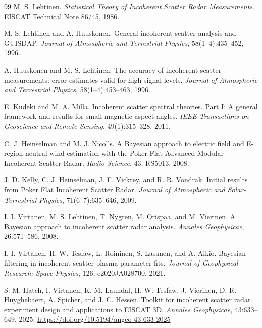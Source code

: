 \documentclass[11pt]{article}
\begin{document}
\begin{thebibliography}{99}
M. S. Lehtinen.
\newblock \emph{Statistical Theory of Incoherent Scatter Radar Measurements}.
\newblock EISCAT Technical Note 86/45, 1986.

M. S. Lehtinen and A. Huuskonen.
\newblock General incoherent scatter analysis and GUISDAP.
\newblock \emph{Journal of Atmospheric and Terrestrial Physics}, 58(1--4):435--452, 1996.

A. Huuskonen and M. S. Lehtinen.
\newblock The accuracy of incoherent scatter measurements: error estimates valid for high signal levels.
\newblock \emph{Journal of Atmospheric and Terrestrial Physics}, 58(1--4):453--463, 1996.

E. Kudeki and M. A. Milla.
\newblock Incoherent scatter spectral theories. Part I: A general framework and results for small magnetic aspect angles.
\newblock \emph{IEEE Transactions on Geoscience and Remote Sensing}, 49(1):315--328, 2011.

C. J. Heinselman and M. J. Nicolls.
\newblock A Bayesian approach to electric field and E-region neutral wind estimation with the Poker Flat Advanced Modular Incoherent Scatter Radar.
\newblock \emph{Radio Science}, 43, RS5013, 2008.

J. D. Kelly, C. J. Heinselman, J. F. Vickrey, and R. R. Vondrak.
\newblock Initial results from Poker Flat Incoherent Scatter Radar.
\newblock \emph{Journal of Atmospheric and Solar-Terrestrial Physics}, 71(6--7):635--646, 2009.

I. I. Virtanen, M. S. Lehtinen, T. Nygren, M. Orispaa, and M. Vierinen.
\newblock A Bayesian approach to incoherent scatter radar analysis.
\newblock \emph{Annales Geophysicae}, 26:571--586, 2008.

I. I. Virtanen, H. W. Tesfaw, L. Roininen, S. Lasanen, and A. Aikio.
\newblock Bayesian filtering in incoherent scatter plasma parameter fits.
\newblock \emph{Journal of Geophysical Research: Space Physics}, 126, e2020JA028700, 2021.

S. M. Hatch, I. Virtanen, K. M. Laundal, H. W. Tesfaw, J. Vierinen, D. R. Huyghebaert, A. Spicher, and J. C. Hessen.
\newblock Toolkit for incoherent scatter radar experiment design and applications to EISCAT 3D.
\newblock \emph{Annales Geophysicae}, 43:633--649, 2025.
\newblock \url{https://doi.org/10.5194/angeo-43-633-2025}


\end{thebibliography}
\end{document}
